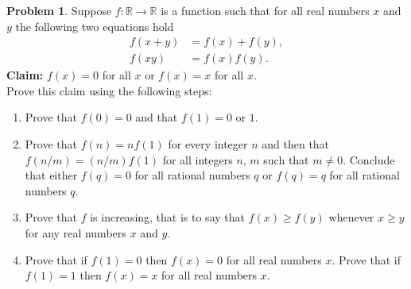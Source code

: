 \documentclass{amsart}
\theoremstyle{definition}
\newtheorem{problem}{Problem}
\begin{document}
\begin{problem}
    Suppose $f: \mathbb{R} \to \mathbb{R}$ is a function such that for all real numbers $x$ and $y$ the following two equations hold
    \begin{align}
        f(x + y) &= f(x) + f(y), \\
        f(xy) &= f(x)f(y).
    \end{align}
    \textbf{Claim:} $f(x) = 0$ for all $x$ or $f(x) = x$ for all $x$. \\
    Prove this claim using the following steps:
    \begin{enumerate}[label = (\alph*)]
        \item Prove that $f(0) = 0$ and that $f(1) = 0$ or $1$.
        \item  Prove that $f(n) = nf(1)$ for every integer $n$ and then that $f(n/m) = (n/m)f(1)$ for all integers $n$, $m$ such that $m \neq 0$. Conclude that either $f(q) = 0$ for all rational numbers $q$ or $f(q) = q$ for all rational numbers $q$.
        \item Prove that $f$ is increasing, that is to say that $f(x) \geq f(y)$ whenever $x \geq y$ for any real numbers $x$ and $y$.
        \item Prove that if $f(1) = 0$ then $f(x) = 0$ for all real numbers $x$. Prove that if $f(1) = 1$ then $f(x) = x$ for all real numbers $x$.        
    \end{enumerate}
\end{problem}
\end{document}
